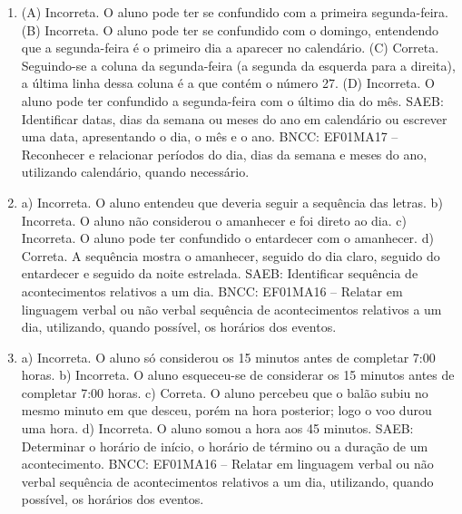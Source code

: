 \begin{enumerate}
\item
(A) Incorreta. O aluno pode ter se confundido com a primeira segunda-feira.
(B) Incorreta. O aluno pode ter se confundido com o domingo, entendendo que
a segunda-feira é o primeiro dia a aparecer no calendário.
(C) Correta. Seguindo-se a coluna da segunda-feira (a segunda da esquerda para a direita), a última linha dessa coluna é a que contém o número 27.
(D) Incorreta. O aluno pode ter confundido a segunda-feira com o último
dia do mês.
SAEB: Identificar datas, dias da semana ou meses do ano em
calendário ou escrever uma data, apresentando o dia, o mês e o ano.
BNCC: EF01MA17 -- Reconhecer e relacionar períodos do dia, dias da semana
e meses do ano, utilizando calendário, quando necessário.

\item
a) Incorreta. O aluno entendeu que deveria seguir a sequência das letras.
b) Incorreta. O aluno não considerou o amanhecer e foi direto ao dia.
c) Incorreta. O aluno pode ter confundido o entardecer com o amanhecer.
d) Correta. A sequência mostra o amanhecer, seguido do dia claro, seguido
do entardecer e seguido da noite estrelada.
SAEB: Identificar sequência de acontecimentos relativos a um dia.
BNCC: EF01MA16 -- Relatar em linguagem verbal ou não verbal sequência de
acontecimentos relativos a um dia, utilizando, quando possível, os
horários dos eventos.

\item
a) Incorreta. O aluno só considerou os 15 minutos antes de
completar 7:00 horas.
b) Incorreta. O aluno esqueceu-se de considerar os 15 minutos antes de
completar 7:00 horas.
c) Correta. O aluno percebeu que o balão subiu no mesmo minuto em
que desceu, porém na hora posterior; logo o voo durou uma hora.
d) Incorreta. O aluno somou a hora aos 45 minutos.
SAEB: Determinar o horário de início, o horário de término ou a
duração de um acontecimento.
BNCC: EF01MA16 -- Relatar em linguagem verbal ou não verbal sequência de
acontecimentos relativos a um dia, utilizando, quando possível, os
horários dos eventos.
\end{enumerate}


